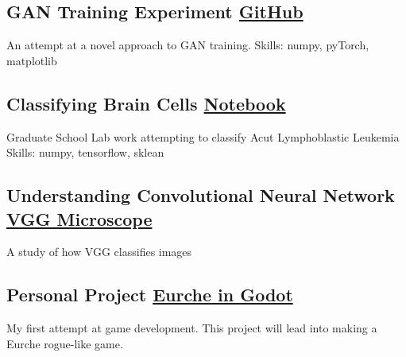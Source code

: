 \subsection{GAN Training Experiment \hfill 	\href{https://nbviewer.org/github/stevenjohnlarsen/GAN-discriminator-refresh-learning/blob/main/GraphsForPaper-No-Feature-Matching.ipynb}{GitHub}}
An attempt at a novel approach to GAN training. 
\hfill Skills: numpy, pyTorch, matplotlib

\vspace*{0.5em}

\subsection{Classifying Brain Cells \hfill \href{https://nbviewer.org/github/nlarsensmu/CNN/blob/master/Merged\%20work.ipynb}{Notebook} }
Graduate School Lab work attempting to classify Acut Lymphoblastic Leukemia 
\hfill Skills: numpy, tensorflow, sklean

\vspace*{0.5em}

\subsection{Understanding Convolutional Neural Network \hfill \href{https://nbviewer.org/github/nlarsensmu/Visualizing-VGG/blob/master/Lab2-Class-Approch.ipynb}{VGG Microscope} }
A study of how VGG classifies images

\vspace*{0.5em}


\subsection{Personal Project \hfill \href{https://github.com/nlarsen31/EurcheGoDot}{Eurche in Godot}}
My first attempt at game development. This project will lead into making a Eurche rogue-like game.
